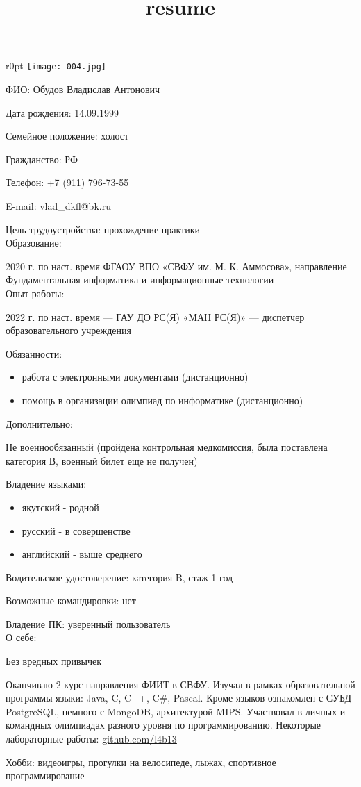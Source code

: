 \documentclass[a4paper,12pt]{article}
\title{resume}
\begin{document}
\begin{center}
    {}
\end{center}

\begin{wrapfigure}{r}{0pt}
    \texttt{[image: 004.jpg]}
\end{wrapfigure}

ФИО: Обудов Владислав Антонович

Дата рождения: 14.09.1999

Семейное положение: холост

Гражданство: РФ

Телефон: +7 (911) 796-73-55

E-mail: vlad\_dkfl@bk.ru

Цель трудоустройства: прохождение практики\\

Образование:

2020 г. по наст. время ФГАОУ ВПО «СВФУ им. М. К. Аммосова», направление Фундаментальная информатика и информационные технологии\\

Опыт работы:

2022 г. по наст. время --- ГАУ ДО РС(Я) «МАН РС(Я)» --- диспетчер образовательного учреждения

Обязанности:
\begin{itemize}
    \setlength\itemsep{0pt}
    \item работа с электронными документами (дистанционно)
    \item помощь в организации олимпиад по информатике (дистанционно)\\
\end{itemize}

Дополнительно:

Не военнообязанный (пройдена контрольная медкомиссия, была поставлена категория В, военный билет еще не получен)

Владение языками:

\begin{itemize}
    \setlength\itemsep{0pt}
    \item якутский - родной
    \item русский - в совершенстве
    \item английский - выше среднего
\end{itemize}

Водительское удостоверение: категория B, стаж 1 год

Возможные командировки: нет

Владение ПК: уверенный пользователь\\

О себе:

Без вредных привычек

Оканчиваю 2 курс направления ФИИТ в СВФУ. Изучал в рамках образовательной программы языки: Java, C, C++, C\#, Pascal. Кроме языков ознакомлен с СУБД PostgreSQL, немного с MongoDB, архитектурой MIPS. Участвовал в личных и командных олимпиадах разного уровня по программированию. Некоторые лабораторные работы: \href{https://github.com/l4b13/}{github.com/l4b13}

Хобби: видеоигры, прогулки на велосипеде, лыжах, спортивное программирование
\end{document}

